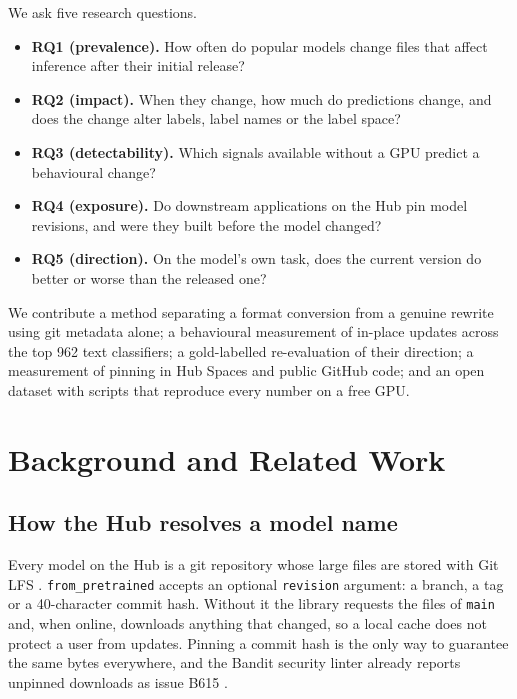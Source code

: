 \documentclass[conference]{IEEEtran}
\newcommand{\code}[1]{\texttt{#1}}
\begin{document}
We ask five research questions.
\begin{itemize}
\item \textbf{RQ1 (prevalence).} How often do popular models change files that affect inference after their initial release?
\item \textbf{RQ2 (impact).} When they change, how much do predictions change, and does the change alter labels, label names or the label space?
\item \textbf{RQ3 (detectability).} Which signals available without a GPU predict a behavioural change?
\item \textbf{RQ4 (exposure).} Do downstream applications on the Hub pin model revisions, and were they built before the model changed?
\item \textbf{RQ5 (direction).} On the model's own task, does the current version do better or worse than the released one?
\end{itemize}

We contribute a method separating a format conversion from a genuine rewrite using git metadata alone; a behavioural measurement of in-place updates across the top 962 text classifiers; a gold-labelled re-evaluation of their direction; a measurement of pinning in Hub Spaces and public GitHub code; and an open dataset with scripts that reproduce every number on a free GPU.

\section{Background and Related Work}

\subsection{How the Hub resolves a model name}
Every model on the Hub is a git repository whose large files are stored with Git LFS \cite{hf-repos}. \code{from\_pretrained} accepts an optional \code{revision} argument: a branch, a tag or a 40-character commit hash. Without it the library requests the files of \code{main} and, when online, downloads anything that changed, so a local cache does not protect a user from updates. Pinning a commit hash is the only way to guarantee the same bytes everywhere, and the Bandit security linter already reports unpinned downloads as issue B615 \cite{bandit-b615}.
\end{document}
